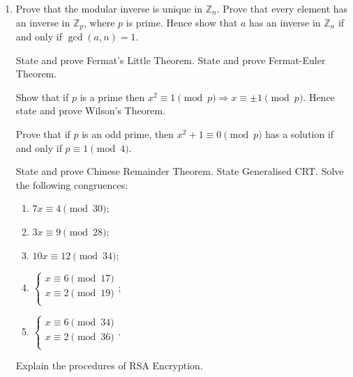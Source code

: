 \documentclass[11pt]{article}
\newcommand{\bbZ}{\mathbb{Z}}
\newlength{\qspace}
\newcounter{qnumber}
\newenvironment{question}%
 {\vspace{\qspace}
  \begin{enumerate}[\bfseries 1\quad][10]%
    \setcounter{enumi}{\value{qnumber}}%
    \item%
 }
{
  \end{enumerate}
  \filbreak
  \stepcounter{qnumber}
 }
\begin{document}
\begin{question}
  Prove that the modular inverse is unique in $ \bbZ_n $. Prove that every element has an inverse in $ \bbZ_p $, where $p$ is prime. Hence show that $a$ has an inverse in $ \bbZ_n $ if and only if $ \gcd(a,n)=1 $.

  State and prove Fermat's Little Theorem. State and prove Fermat-Euler Theorem.

  Show that if $p$ is a prime then $ x^2 \equiv 1 \pmod{p} \Rightarrow x \equiv \pm 1 \pmod p $. Hence state and prove Wilson's Theorem.

  Prove that if $p$ is an odd prime, then $ x^2 +1\equiv 0 \pmod p $ has a solution if and only if $ p \equiv 1 \pmod 4 $.

  State and prove Chinese Remainder Theorem. State Generalised CRT. Solve the following congruences:
  \begin{multicols}{3}
    \begin{enumerate}
      \item $ 7x \equiv 4\pmod{30} $;
      \item $ 3x \equiv 9 \pmod{28} $;
      \item $ 10x \equiv 12 \pmod{{34}} $;
      \item $ \begin{cases}
      x \equiv 6 \pmod{17} \\
      x \equiv 2 \pmod{19} \\
      \end{cases}$;
      \item $ \begin{cases}
        x \equiv 6 \pmod{34} \\
        x \equiv 2 \pmod{36} \\
        \end{cases} $.
    \end{enumerate}
  \end{multicols}

  Explain the procedures of RSA Encryption.
\end{question}
\end{document}
